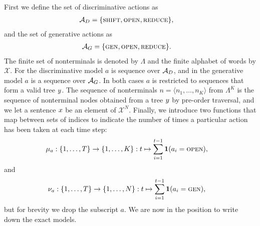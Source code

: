     First we define the set of discriminative actions as
    \begin{align}
      \mathcal{A}_D &= \{ \textsc{shift}, \textsc{open}, \textsc{reduce} \},
    \end{align}
    and the set of generative actions as
    \begin{align}
      \mathcal{A}_G &= \{ \textsc{gen}, \textsc{open}, \textsc{reduce} \}.
    \end{align}
    The finite set of nonterminals is denoted by $\Lambda$ and the finite alphabet of words by $\mathcal{X}$. For the discriminative model $a$ is sequence over $\mathcal{A}_D$, and in the generative model $a$ is a sequence over $\mathcal{A}_G$. In both cases $a$ is restricted to sequences that form a valid tree $y$. The sequence of nonterminals $n = \langle n_1, \dots, n_K \rangle$ from $\Lambda^K$ is the sequence of nonterminal nodes obtained from a tree $y$ by pre-order traversal, and we let a sentence $x$ be an element of $\mathcal{X}^N$. Finally, we introduce two functions that map between sets of indices to indicate the number of times a particular action has been taken at each time step:
    \begin{align*}
      \mu_a &: \{ 1, \dots, T \} \to \{ 1, \dots, K \}: t \mapsto \sum_{i=1}^{t-1} \operatorname{\mathbf{1}}(a_i = \textsc{open}),
    \end{align*}
    and
    \begin{align*}
      \nu_a &: \{ 1, \dots, T \} \to \{ 1, \dots, N \}: t \mapsto \sum_{i=1}^{t-1} \operatorname{\mathbf{1}}(a_i = \textsc{gen}),
    \end{align*}
    but for brevity we drop the subscript $a$. We are now in the position to write down the exact models.

